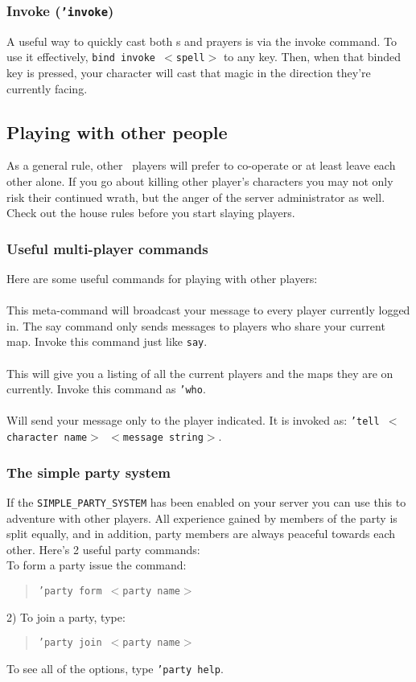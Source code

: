 \subsubsection{Invoke ({\tt 'invoke})}  
A useful way to quickly cast both \incantation s and prayers is via the invoke
command. To use it effectively, {\tt bind invoke $<$spell$>$} to any 
key. Then, when that binded key is pressed, your character will cast that magic
in the direction they're currently facing.

\subsection{Playing with other people}

As a general rule, other \cf\ players will prefer to co-operate or
at least leave each other alone. If you go about killing other player's
characters you may not only risk their continued wrath, but the anger of
the server administrator as well. Check out the house rules before you 
start slaying players.

\subsubsection{Useful multi-player commands}

Here are some useful commands for playing with other players: \\

 \\
This meta-command will broadcast your message to every player currently
logged in. The say command only sends messages to players who share your
current map. Invoke this command just like {\tt say}.\\ 

 \\
This will give you a listing of all the current players and the maps
they are on currently. Invoke this command as {\tt 'who}.\\ 

 \\
Will send your message only to the player indicated. It is invoked as:
{\tt 'tell $<$character name$>$ $<$message string$>$}.\\ 

\subsubsection{The simple party system} 
If the {\tt SIMPLE\_PARTY\_SYSTEM} has been enabled on your server you can 
use this to adventure with other players. All experience gained by 
members of the party is split equally, and in addition, party members 
are always peaceful towards each other. Here's 2 useful party commands:\\

 To form a party issue the command: 
\begin{quote}
{\tt 'party form $<$party name$>$ }  
\end{quote}
2) To join a party, type:
\begin{quote}
{\tt 'party join $<$party name$>$ } 
\end{quote}
To see all of the options, type {\tt 'party help}.



